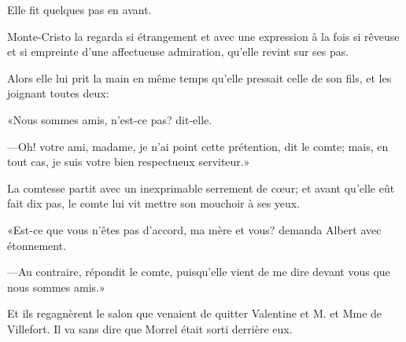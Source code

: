 Elle fit quelques pas en avant. 

Monte-Cristo la regarda si étrangement et avec une expression à la fois si rêveuse et si empreinte d'une affectueuse admiration, qu'elle revint sur ses pas. 

Alors elle lui prit la main en même temps qu'elle pressait celle de son fils, et les joignant toutes deux: 

«Nous sommes amis, n'est-ce pas? dit-elle. 

—Oh! votre ami, madame, je n'ai point cette prétention, dit le comte; mais, en tout cas, je suis votre bien respectueux serviteur.» 

La comtesse partit avec un inexprimable serrement de cœur; et avant qu'elle eût fait dix pas, le comte lui vit mettre son mouchoir à ses yeux. 

«Est-ce que vous n'êtes pas d'accord, ma mère et vous? demanda Albert avec étonnement. 

—Au contraire, répondit le comte, puisqu'elle vient de me dire devant vous que nous sommes amis.» 

Et ils regagnèrent le salon que venaient de quitter Valentine et M. et Mme de Villefort. Il va sans dire que Morrel était sorti derrière eux. 